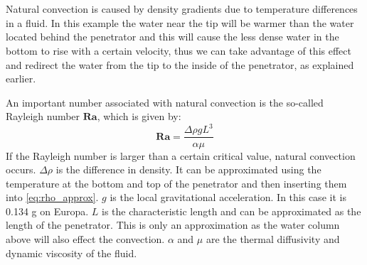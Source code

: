 \\
\\
Natural convection is caused by density gradients due to temperature differences in a fluid. In this example the water near the tip will be warmer than the water located behind the penetrator and this will cause the less dense water in the bottom to rise with a certain velocity, thus we can take advantage of this effect and redirect the water from the tip to the inside of the penetrator, as explained earlier\cite{website:naturalConvectionPdf}.

An important number associated with natural convection is the so-called Rayleigh number $\mathbf{Ra}$, which is given by\cite{website:naturalConvectionWiki}:
\begin{equation}
	\mathbf{Ra} = \frac{\Delta\rho g L^3}{\alpha \mu}
\end{equation}
If the Rayleigh number is larger than a certain critical value, natural convection occurs. $\Delta\rho$ is the difference in density. It can be approximated using the temperature at the bottom and top of the penetrator and then inserting them into \eqref{eq:rho_approx}. $g$ is the local gravitational acceleration. In this case it is 0.134 g on Europa\cite{website:europaGravity}. $L$ is the characteristic length and can be approximated as the length of the penetrator. This is only an approximation as the water column above will also effect the convection. $\alpha$ and $\mu$ are the thermal diffusivity and dynamic viscosity of the fluid. %


